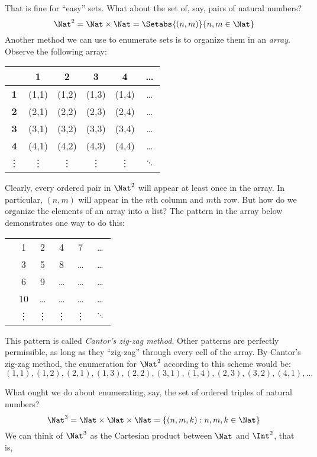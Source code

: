 \documentclass[../../include/open-logic-section]{subfiles}
\begin{document}
\begin{explain}
That is fine for ``easy'' sets. What about the set of, say, pairs of 
natural numbers?
\[ \Nat^2 = \Nat \times \Nat = \Setabs{(n,m)}{n,m \in \Nat}\]
Another method we can use to enumerate sets is to organize them 
in an \emph{array}. Observe the following array:

\center
\begin{tabular}{| c | c | c | c | c | c}
\hline
& \textbf 1 & \textbf 2 & \textbf 3 & \textbf 4 & \dots \\
\hline
\textbf 1 & (1,1) & (1,2) & (1,3) & (1,4) & \dots \\
\hline
\textbf 2 & (2,1) & (2,2) & (2,3) & (2,4) & \dots \\
\hline
\textbf 3 & (3,1) & (3,2) & (3,3) & (3,4) & \dots \\
\hline
\textbf 4 & (4,1) & (4,2) & (4,3) & (4,4) & \dots \\
\hline
\vdots & \vdots & \vdots & \vdots & \vdots & $\ddots$\\
\end{tabular}
\flushleft

Clearly, every ordered pair in $\Nat^2$ will appear at least 
once in the array. In particular, $(n,m)$ will appear in the $n$th 
column and $m$th row. But how do we organize the elements of an 
array into a list? The pattern in the array below demonstrates one 
way to do this:

\center
\begin{tabular}{| c | c | c | c | c | c }
\hline
& & & & & \\
\hline
& 1 & 2 & 4 & 7 & \dots \\
\hline
& 3 & 5 & 8 & \dots & \dots \\
\hline
& 6 & 9 & \dots & \dots & \dots \\
\hline
& 10 & \dots & \dots & \dots & \dots \\
\hline
& \vdots & \vdots & \vdots & \vdots & $\ddots$\\ 
\end{tabular}

\flushleft
This pattern is called \emph{Cantor's zig-zag method}. Other 
patterns are perfectly permissible, as long as they ``zig-zag'' 
through every cell of the array. By Cantor's zig-zag method, the 
enumeration for $\Nat^2$ according to this scheme would be:
\[(1,1), (1,2), (2,1), (1,3), (2,2), (3,1), (1,4), (2,3), (3,2), (4,1), \dots\]

What ought we do about enumerating, say, the set of ordered triples 
of natural numbers?
\[ \Nat^3 = \Nat \times \Nat \times \Nat = 
\{ (n,m,k) : n,m,k \in \Nat \} \]
We can think of $\Nat^3$ as the Cartesian product between 
$\Nat$ and $\Int^2$, that is, 


\end{explain}
\end{document}
